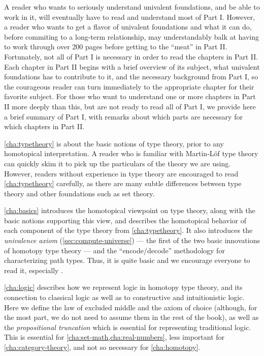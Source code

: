 A reader who wants to seriously understand univalent foundations, and be able to work in it, will eventually have to read and understand most of Part I.
However, a reader who wants to get a flavor of univalent foundations and what it can do, before commiting to a long-term relationship, may understandably balk at having to work through over 200 pages before getting to the ``meat'' in Part II.
Fortunately, not all of Part I is necessary in order to read the chapters in Part II.
Each chapter in Part II begins with a brief overview of its subject, what univalent foundations has to contribute to it, and the necessary background from Part I, so the courageous reader can turn immediately to the appropriate chapter for their favorite subject.
For those who want to understand one or more chapters in Part II more deeply than this, but are not ready to read all of Part I, we provide here a brief summary of Part I, with remarks about which parts are necessary for which chapters in Part II.

\autoref{cha:typetheory} is about the basic notions of type theory, prior to any homotopical interpretation.
A reader who is familiar with Martin-L\"of type theory can quickly skim it to pick up the particulars of the theory we are using.
However, readers without experience in type theory are encouraged to read \autoref{cha:typetheory} carefully, as there are many subtle differences between type theory and other foundations such as set theory.

\autoref{cha:basics} introduces the homotopical viewpoint on type theory, along with the basic notions supporting this view, and describes the homotopical behavior of each component of the type theory from \autoref{cha:typetheory}.
It also introduces the \emph{univalence axiom} (\autoref{sec:compute-universe}) --- the first of the two basic innovations of homotopy type theory --- and the ``encode/decode'' methodology for characterizing path types.
Thus, it is quite basic and we encourage everyone to read it, especially .

\autoref{cha:logic} describes how we represent logic in homotopy type theory, and its connection to classical logic as well as to constructive and intuitionistic logic.
Here we define the law of excluded middle and the axiom of choice (although, for the most part, we do not need to assume them in the rest of the book), as well as the \emph{propositional truncation} which is essential for representing traditional logic.
This is essential for \autoref{cha:set-math,cha:real-numbers}, less important for \autoref{cha:category-theory}, and not so necessary for \autoref{cha:homotopy}.

